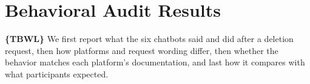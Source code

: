 \documentclass[conference,compsoc]{IEEEtran}
\begin{document}
\section{Behavioral Audit Results}
\label{sec:audit-results}

\textbf{\{TBWL\}}
We first report what the six chatbots said and did after a deletion request, then how platforms and request wording differ, then whether the behavior matches each platform's documentation, and last how it compares with what participants expected.
\end{document}
